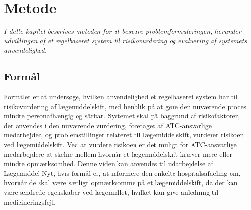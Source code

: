 \chapter{Metode}
\textit{I dette kapitel beskrives metoden for at besvare problemformuleringen, herunder udviklingen af et regelbaseret system til risikovurdering og evaluering af systemets anvendelighed.}

\section{Formål}
Formålet er at undersøge, hvilken anvendelighed et regelbaseret system har til risikovurdering af lægemiddelskift, med henblik på at gøre den nuværende proces mindre personafhængig og sårbar. Systemet skal på baggrund af risikofaktorer, der anvendes i den nuværende vurdering, foretaget af ATC-ansvarlige medarbejder, og problemstillinger relateret til lægemiddelskift, vurderer risikoen ved lægemiddelskift. Ved at vurdere risikoen er det muligt for ATC-ansvarlige medarbejdere at skelne mellem hvornår et lægemiddelskift kræver mere eller mindre opmærksomhed. Denne viden kan anvendes til udarbejdelse af Lægemiddel Nyt, hvis formål er, at informere den enkelte hospitalsafdeling om, hvornår de skal være særligt opmærksomme på et lægemiddelskift, da der kan være ændrede egenskaber ved lægemidlet, hvilket kan give anledning til medicineringsfejl.





